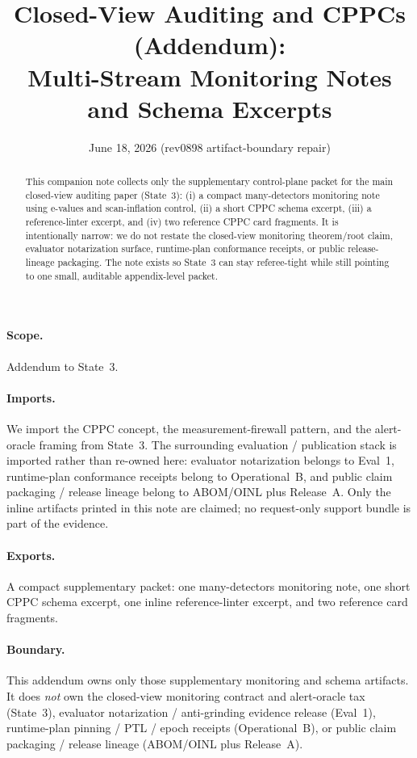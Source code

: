 \documentclass[11pt]{article}
\title{Closed-View Auditing and CPPCs (Addendum):\\Multi-Stream Monitoring Notes and Schema Excerpts}
\author{}
\date{June 18, 2026 (rev0898 artifact-boundary repair)}
\theoremstyle{definition}
\theoremstyle{remark}
\begin{document}
\maketitle

\begin{abstract}
This companion note collects only the supplementary control-plane packet for the main closed-view auditing paper (State~3):
(i) a compact many-detectors monitoring note using e-values and scan-inflation control,
(ii) a short CPPC schema excerpt,
(iii) a reference-linter excerpt, and
(iv) two reference CPPC card fragments.
It is intentionally narrow: we do not restate the closed-view monitoring theorem/root claim, evaluator notarization surface, runtime-plan conformance receipts, or public release-lineage packaging.
The note exists so State~3 can stay referee-tight while still pointing to one small, auditable appendix-level packet.
\end{abstract}

\paragraph{Scope.}
Addendum to State~3.\cite{series:state3}

\paragraph{Imports.}
We import the CPPC concept, the measurement-firewall pattern, and the alert-oracle framing from State~3.\cite{series:state3}
The surrounding evaluation / publication stack is imported rather than re-owned here: evaluator notarization belongs to Eval~1, runtime-plan conformance receipts belong to Operational~B, and public claim packaging / release lineage belong to ABOM/OINL plus Release~A.\cite{series:evalnotary,series:opB,series:abomoinl,series:releaseproperty}
Only the inline artifacts printed in this note are claimed; no request-only support bundle is part of the evidence.

\paragraph{Exports.}
A compact supplementary packet: one many-detectors monitoring note, one short CPPC schema excerpt, one inline reference-linter excerpt, and two reference card fragments.

\paragraph{Boundary.}
This addendum owns only those supplementary monitoring and schema artifacts.
It does \emph{not} own the closed-view monitoring contract and alert-oracle tax (State~3), evaluator notarization / anti-grinding evidence release (Eval~1), runtime-plan pinning / PTL / epoch receipts (Operational~B), or public claim packaging / release lineage (ABOM/OINL plus Release~A).\cite{series:state3,series:evalnotary,series:opB,series:abomoinl,series:releaseproperty}
\end{document}
